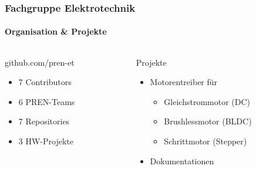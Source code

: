 \begin{frame}
	\frametitle{Fachgruppe Elektrotechnik \hfill{} \footnotesize \group}
	\framesubtitle{Organisation \& Projekte}
	\begin{columns}
		\begin{column}{0.5\textwidth}
			\begin{block}{github.com/pren-et}
				\begin{itemize}
					\item 7 Contributors
					\item 6 PREN-Teams
					\item 7 Repositories
					\item 3 HW-Projekte
				\end{itemize}
			\end{block}
		\end{column}
		\begin{column}{0.5\textwidth}
			\begin{exampleblock}{Projekte}
				\begin{itemize}
					\item Motorentreiber für
						\begin{itemize}
							\item Gleichstrommotor (DC)
							\item Brushlessmotor (BLDC)
							\item Schrittmotor (Stepper)
						\end{itemize}
					\item Dokumentationen
				\end{itemize}
			\end{exampleblock}
		\end{column}
	\end{columns}
\end{frame}

